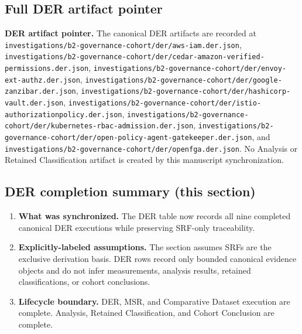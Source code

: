 \subsection{Full DER artifact pointer}
\textbf{DER artifact pointer.} The canonical DER artifacts are recorded at \texttt{investigations/b2-governance-cohort/der/aws-iam.der.json}, \texttt{investigations/b2-governance-cohort/der/cedar-amazon-verified-permissions.der.json}, \texttt{investigations/b2-governance-cohort/der/envoy-ext-authz.der.json}, \texttt{investigations/b2-governance-cohort/der/google-zanzibar.der.json}, \texttt{investigations/b2-governance-cohort/der/hashicorp-vault.der.json}, \texttt{investigations/b2-governance-cohort/der/istio-authorizationpolicy.der.json}, \texttt{investigations/b2-governance-cohort/der/kubernetes-rbac-admission.der.json}, \texttt{investigations/b2-governance-cohort/der/open-policy-agent-gatekeeper.der.json}, and \texttt{investigations/b2-governance-cohort/der/openfga.der.json}. No Analysis or Retained Classification artifact is created by this manuscript synchronization.

\subsection{DER completion summary (this section)}
\begin{enumerate}
\item \textbf{What was synchronized.} The DER table now records all nine completed canonical DER executions while preserving SRF-only traceability.
\item \textbf{Explicitly-labeled assumptions.} The section assumes SRFs are the exclusive derivation basis. DER rows record only bounded canonical evidence objects and do not infer measurements, analysis results, retained classifications, or cohort conclusions.
\item \textbf{Lifecycle boundary.} DER, MSR, and Comparative Dataset execution are complete. Analysis, Retained Classification, and Cohort Conclusion are complete.
\end{enumerate}

